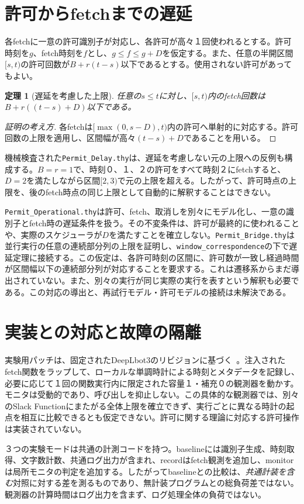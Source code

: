 \documentclass[10pt,twocolumn]{ltjsarticle}
\newtheorem{theorem}{定理}
\begin{document}
\section{許可からfetchまでの遅延}
各fetchに一意の許可識別子が対応し、各許可が高々１回使われるとする。許可時刻を$g$、fetch時刻を$f$とし、$g\le f\le g+D$を仮定する。また、任意の半開区間$[s,t)$の許可回数が$B+r(t-s)$以下であるとする。使用されない許可があってもよい。
\begin{theorem}[遅延を考慮した上限]\label{thm:delay}
任意の$s\leq t$に対し、$[s,t)$内のfetch回数は$B+r((t-s)+D)$以下である。
\end{theorem}
\begin{proof}[証明の考え方]
各fetchは$[\max(0,s-D),t)$内の許可へ単射的に対応する。許可回数の上限を適用し、区間幅が高々$(t-s)+D$であることを用いる。
\end{proof}
機械検査された\texttt{Permit\_Delay.thy}は、遅延を考慮しない元の上限への反例も構成する。$B=r=1$で、時刻０、１、２の許可をすべて時刻２にfetchすると、$D=2$を満たしながら区間$[2,3)$で元の上限を超える。したがって、許可時点の上限を、後のfetch時点の同じ上限として自動的に解釈することはできない。

\texttt{Permit\_Operational.thy}は許可、fetch、取消しを別々にモデル化し、一意の識別子とfetch時の遅延条件を扱う。その不変条件は、許可が最終的に使われることや、実際のスケジューラが$D$を満たすことを確立しない。\texttt{Permit\_Bridge.thy}は並行実行の任意の連続部分列の上限を証明し、\texttt{window\_correspondence}の下で遅延定理に接続する。この仮定は、各許可時刻の区間に、許可数が一致し経過時間が区間幅以下の連続部分列が対応することを要求する。これは遷移系からまだ導出されていない。また、別々の実行が同じ実際の実行を表すという解釈も必要である。この対応の導出と、再試行モデル・許可モデルの接続は未解決である。

\section{実装との対応と故障の隔離}
実験用パッチは、固定されたDeepLbot3のリビジョンに基づく~\cite{repository}。注入されたfetch関数をラップして、ローカルな単調時計による時刻とメタデータを記録し、必要に応じて１回の関数実行内に限定された容量１・補充０の観測器を動かす。モニタは受動的であり、呼び出しを抑止しない。この具体的な観測器では、別々のSlack Functionにまたがる全体上限を確立できず、実行ごとに異なる時計の起点を相互に比較できるとも仮定できない。許可に関する理論に対応する許可操作は実装されていない。

３つの実験モードは共通の計測コードを持つ。baselineには識別子生成、時刻取得、文字数計数、共通ログ出力が含まれ、recordはfetch観測を追加し、monitorは局所モニタの判定を追加する。したがってbaselineとの比較は、\emph{共通計装を含む}対照に対する差を測るものであり、無計装プログラムとの総負荷差ではない。観測器の計算時間はログ出力を含まず、ログ処理全体の負荷ではない。
\end{document}
